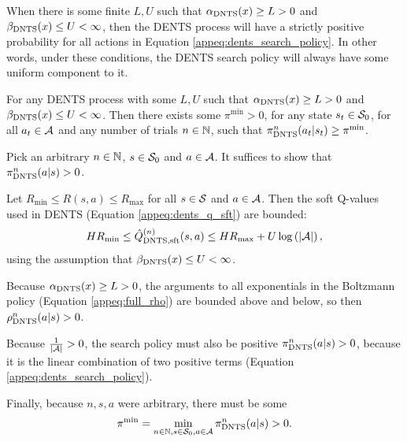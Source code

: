     When there is some finite $L,U$ such that ${\alpha_{{\textnormal{DNTS}}}}(x) \geq L > 0$ and ${\beta_{{\textnormal{DNTS}}}}(x) \leq U < \infty$, then the DENTS process will have a strictly positive probability for all actions in Equation \eqref{appeq:dents_search_policy}. In other words, under these conditions, the DENTS search policy will always have some uniform component to it.
    \begin{lemma} \label{lem:min_prob_dents}
        For any DENTS process with some $L,U$ such that ${\alpha_{{\textnormal{DNTS}}}}(x) \geq L > 0$ and ${\beta_{{\textnormal{DNTS}}}}(x) \leq U < \infty$. Then there exists some $\pi^{\min}>0$, for any state $s_t\in\mathcal{S}_0$, for all $a_t\in\mathcal{A}$ and any number of trials $n\in\mathbb{N}$, such that ${\pi^{n}_{{\textnormal{DNTS}}}}(a_t|s_t)\geq\pi^{\min}$.
    \end{lemma}
    \begin{proofoutline}
        Pick an arbitrary $n\in\mathbb{N}$, $s\in\mathcal{S}_0$ and $a\in\mathcal{A}$. It suffices to show that ${\pi^{n}_{{\textnormal{DNTS}}}}(a|s) > 0$.

        Let $R_{\min} \leq R(s,a) \leq R_{\max}$ for all $s\in\mathcal{S}$ and $a\in\mathcal{A}$. Then the soft Q-values used in DENTS (Equation \ref{appeq:dents_q_sft}) are bounded:
        \begin{align}
            HR_{\min} \leq {\hat{Q}^{(n)}_{{\textnormal{DNTS}},{\textnormal{sft}}}}(s,a) \leq HR_{\max} + U\log\left(|\mathcal{A}|\right),
        \end{align}
        using the assumption that ${\beta_{{\textnormal{DNTS}}}}(x) \leq U < \infty$.

        Because ${\alpha_{{\textnormal{DNTS}}}}(x) \geq L > 0$, the arguments to all exponentials in the Boltzmann policy (Equation \eqref{appeq:full_rho}) are bounded above and below, so then ${\rho^{n}_{{\textnormal{DNTS}}}}(a|s) > 0$.

        Because $\frac{1}{|\mathcal{A}|} > 0$, the search policy must also be positive ${\pi^{n}_{{\textnormal{DNTS}}}}(a|s) > 0$, because it is the linear combination of two positive terms (Equation \ref{appeq:dents_search_policy}).

        Finally, because $n,s,a$ were arbitrary, there must be some 
        \begin{align}
            \pi^{\min} = \min_{n\in\mathbb{N},s\in\mathcal{S}_0,a\in\mathcal{A}} {\pi^{n}_{{\textnormal{DNTS}}}}(a|s) > 0.
        \end{align}
    \end{proofoutline}

    \proofsep














